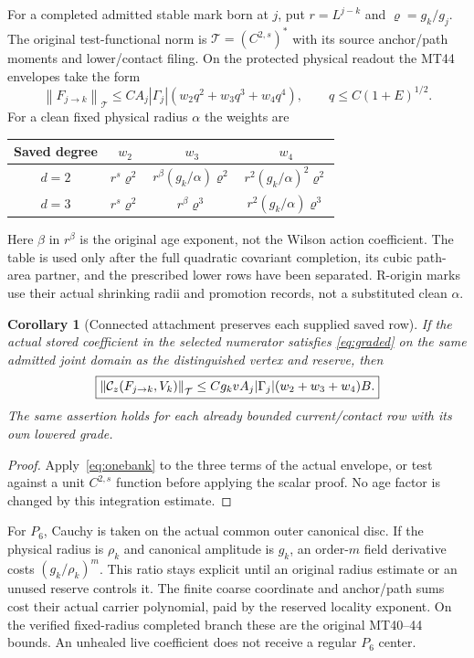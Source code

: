 \documentclass[11pt,letterpaper]{article}
\theoremstyle{plain}
\newtheorem{corollary}[theorem]{Corollary}
\theoremstyle{remark}\newtheorem{remark}[theorem]{Scope}
\newcommand{\norm}[1]{\left\lVert#1\right\rVert}
\newcommand{\cT}{\mathcal T}\newcommand{\eps}{\varepsilon}
\begin{document}
For a completed admitted stable mark born at $j$, put
$r=L^{j-k}$ and $\varrho=g_k/g_j$. The original test-functional norm is
$\cT=(C^{2,s})^*$ with its source anchor/path moments and lower/contact
filing. On the protected physical readout the MT44 envelopes take the form
\begin{equation}
\norm{F_{j\to k}}_{\cT}
\le C A_j|\Gamma_j|(w_2q^2+w_3q^3+w_4q^4),
\qquad q\le C(1+E)^{1/2}.
\label{eq:graded}
\end{equation}
For a clean fixed physical radius $\alpha$ the weights are
\begin{center}
\begin{tabular}{@{}c c c c@{}}
\toprule
Saved degree & $w_2$ & $w_3$ & $w_4$\\
\midrule
$d=2$ & $r^s\varrho^2$ & $r^\beta(g_k/\alpha)\varrho^2$
& $r^2(g_k/\alpha)^2\varrho^2$\\[3pt]
$d=3$ & $r^s\varrho^2$ & $r^\beta\varrho^3$
& $r^2(g_k/\alpha)\varrho^3$\\
\bottomrule
\end{tabular}
\end{center}
Here $\beta$ in $r^\beta$ is the original age exponent, not the Wilson action
coefficient. The table is used only after the full quadratic covariant
completion, its cubic path-area partner, and the prescribed lower rows have
been separated. R-origin marks use their actual shrinking radii and promotion
records, not a substituted clean $\alpha$.

\begin{corollary}[Connected attachment preserves each supplied saved row]
If the actual stored coefficient in the selected numerator satisfies
\eqref{eq:graded} on the same admitted joint domain as the distinguished
vertex and reserve, then
\begin{equation}
\boxed{
\norm{\cC_z(F_{j\to k},V_k)}_{\cT}
\le Cg_kvA_j|\Gamma_j|(w_2+w_3+w_4)B.}
\label{eq:gradedattachment}
\end{equation}
The same assertion holds for each already bounded current/contact row with
its own lowered grade.
\end{corollary}
\begin{proof}
Apply~\eqref{eq:onebank} to the three terms of the actual envelope, or test
against a unit $C^{2,s}$ function before applying the scalar proof. No age
factor is changed by this integration estimate.
\end{proof}

For $P_6$, Cauchy is taken on the actual common outer canonical disc. If the
physical radius is $\rho_k$ and canonical amplitude is $g_k$, an order-$m$
field derivative costs $(g_k/\rho_k)^m$. This ratio stays explicit until an
original radius estimate or an unused reserve controls it. The finite coarse
coordinate and anchor/path sums cost their actual carrier polynomial, paid
by the reserved locality exponent. On the verified fixed-radius completed
branch these are the original MT40--44 bounds. An unhealed live coefficient
does not receive a regular $P_6$ center.
\end{document}

